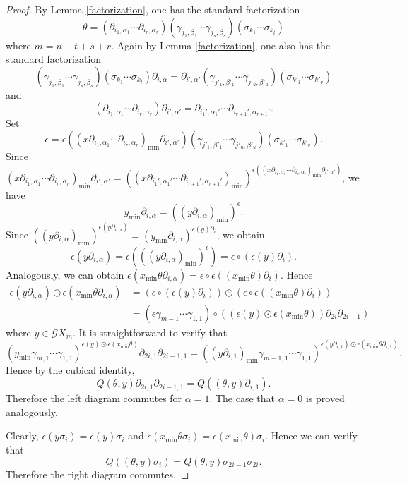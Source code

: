 \documentclass[oneside, 12pt]{amsart}
\numberwithin{equation}{section}
\theoremstyle{plain}
\theoremstyle{definition}
\theoremstyle{remark}
\begin{document}
	\begin{proof}
		By Lemma \ref{factorization}, one has the standard factorization
		\[
		\theta=(\partial_{i_1,\alpha_1}\cdots\partial_{i_r,\alpha_r})(\gamma_{j_1,\beta_1}\cdots\gamma_{j_s,\beta_s})(\sigma_{k_1}\cdots\sigma_{k_t})
		\]
		where $m=n-t+s+r$. Again by Lemma \ref{factorization}, one also has the standard factorization
		\[
		(\gamma_{j_1,\beta_1}\cdots\gamma_{j_s,\beta_s})(\sigma_{k_1}\cdots\sigma_{k_t})\partial_{i,\alpha}=\partial_{i',\alpha'}(\gamma_{j'_1,\beta'_1}\cdots\gamma_{j'_u,\beta'_u})(\sigma_{k'_1}\cdots\sigma_{k'_v})
		\]
		and
		\[
		(\partial_{i_1,\alpha_1}\cdots\partial_{i_r,\alpha_r})\partial_{i',\alpha'}=\partial_{i_1',\alpha_1'}\cdots\partial_{i_{r+1}',\alpha_{r+1}'}.
		\]
		Set
		\[
		\epsilon=\epsilon((x\partial_{i_1,\alpha_1}\cdots\partial_{i_r,\alpha_r})_\mathrm{min}\partial_{i',\alpha'})(\gamma_{j'_1,\beta'_1}\cdots\gamma_{j'_u,\beta'_u})(\sigma_{k'_1}\cdots\sigma_{k'_v}).
		\]
		Since $(x\partial_{i_1,\alpha_1}\cdots\partial_{i_r,\alpha_r})_\mathrm{min}\partial_{i',\alpha'}=((x\partial_{i_1',\alpha_1'}\cdots\partial_{i_{r+1}',\alpha_{r+1}'})_\mathrm{min})^{\epsilon((x\partial_{i_1,\alpha_1}\cdots\partial_{i_r,\alpha_r})_\mathrm{min}\partial_{i',\alpha'})}$, we have
		\[
		y_\mathrm{min}\partial_{i,\alpha}=((y\partial_{i,\alpha})_\mathrm{min})^\epsilon.
		\]
		Since $((y\partial_{i,\alpha})_\mathrm{min})^{\epsilon(y\partial_{i,\alpha})}=(y_\mathrm{min}\partial_{i,\alpha})^{\epsilon(y)\partial_i}$, we obtain
		\[
		\epsilon(y\partial_{i,\alpha})=\epsilon(((y\partial_{i,\alpha})_\mathrm{min})^\epsilon)=\epsilon\circ(\epsilon(y)\partial_i).
		\]
		Analogously, we can obtain $\epsilon(x_\mathrm{min}\theta\partial_{i,\alpha})=\epsilon\circ\epsilon((x_\mathrm{min}\theta)\partial_i)$. Hence
		\begin{align*}
			\epsilon(y\partial_{i,\alpha})\odot\epsilon(x_\mathrm{min}\theta\partial_{i,\alpha})&=(\epsilon\circ(\epsilon(y)\partial_i))\odot(\epsilon\circ\epsilon((x_\mathrm{min}\theta)\partial_i))\\
			&=(\epsilon\gamma_{m-1}\cdots\gamma_{1,1})\circ((\epsilon(y)\odot\epsilon(x_\mathrm{min}\theta))\partial_{2i}\partial_{2i-1})
		\end{align*}
		where $y\in\mathcal{G}X_m$. It is straightforward to verify that
		\[
		(y_\mathrm{min}\gamma_{m,1}\cdots\gamma_{1,1})^{\epsilon(y)\odot\epsilon(x_\mathrm{min}\theta)}\partial_{2i,1}\partial_{2i-1,1}=((y\partial_{i,1})_\mathrm{min}\gamma_{m-1,1}\cdots\gamma_{1,1})^{\epsilon(y\partial_{i,1})\odot\epsilon(x_\mathrm{min}\theta\partial_{i,1})}.
		\]
		Hence by the cubical identity,
		\[
		Q(\theta,y)\partial_{2i,1}\partial_{2i-1,1}=Q((\theta,y)\partial_{i,1}).
		\]
		Therefore the left diagram commutes for $\alpha=1$. The case that $\alpha=0$ is proved analogously.
		
		
		
		Clearly, $\epsilon(y\sigma_i)=\epsilon(y)\sigma_i$ and $\epsilon(x_\mathrm{min}\theta\sigma_i)=\epsilon(x_\mathrm{min}\theta)\sigma_i$. Hence we can verify that
		\[
		Q((\theta,y)\sigma_i)=Q(\theta,y)\sigma_{2i-1}\sigma_{2i}.
		\]
		Therefore the right diagram commutes.
	\end{proof}
	
\end{document}

